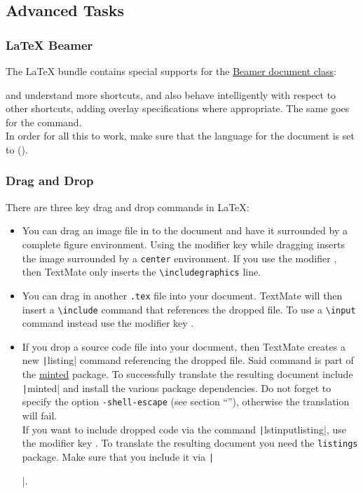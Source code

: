 \documentclass[11pt, x11names]{article}
\begin{document}
\subsection{Advanced Tasks}

\subsubsection{LaTeX Beamer}

The LaTeX bundle contains special supports for the \href{https://bitbucket.org/rivanvx/beamer/wiki/Home}{Beamer document class}:

 and  understand more shortcuts, and also behave intelligently with respect to other shortcuts, adding overlay specifications where appropriate. The same goes for the  command.\\

In order for all this to work, make sure that the language for the document is set to  ().

\subsubsection{Drag and Drop}

There are three key drag and drop commands in LaTeX:

\begin{itemize}

    \item You can drag an image file in to the document and have it surrounded by a complete figure environment. Using the modifier key \keys{\Alt} while dragging inserts the image surrounded by a \texttt{center} environment. If you use the modifier \keys{\shift}, then TextMate only inserts the \texttt{\textbackslash{}includegraphics} line.

    \item You can drag in another \texttt{.tex} file into your document. TextMate will then insert a \texttt{\textbackslash{}include} command that references the dropped file. To use a \texttt{\textbackslash{}input} command instead use the modifier key \keys{\Alt}.

    \item If you drop a source code file into your document, then TextMate creates a new \texttt|listing| command referencing the dropped file. Said command is part of the \href{http://ctan.org/pkg/minted}{minted} package. To successfully translate the resulting document include \texttt|minted| and install the various package dependencies. Do not forget to specify the option \texttt{-shell-escape} (see section “”), otherwise the translation will fail.\\

    If you want to include dropped code via the command \texttt|lstinputlisting|, use the modifier key \keys{\shift}. To translate the resulting document you need the \texttt{listings} package. Make sure that you include it via \texttt|\usepackage{listings}|.

\end{itemize}
\end{document}
